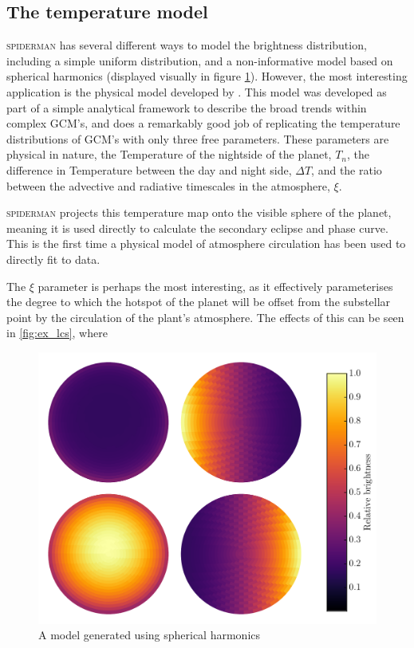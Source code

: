 \documentclass[a4paper,fleqn,usenatbib]{mnras}
\begin{document}
\subsection{The temperature model}\label{sec:temp model}

\textsc{spiderman} has several different ways to model the brightness distribution, including a simple uniform distribution, and a non-informative model based on spherical harmonics (displayed visually in figure \ref{fig:harmonics}). However, the most interesting application is the physical model developed by \citet{Zhang2016}. This model was developed as part of a simple analytical framework to describe the broad trends within complex GCM's, and does a remarkably good job of replicating the temperature distributions of GCM's with only three free parameters. These parameters are physical in nature, the Temperature of the nightside of the planet, $T_n$, the difference in Temperature between the day and night side, $\Delta T$, and the ratio between the advective and radiative timescales in the atmosphere, $\xi$.

\textsc{spiderman} projects this temperature map onto the visible sphere of the planet, meaning it is used directly to calculate the secondary eclipse and phase curve. This is the first time a physical model of atmosphere circulation has been used to directly fit to data.

The $\xi$ parameter is perhaps the most interesting, as it effectively parameterises the degree to which the hotspot of the planet will be offset from the substellar point by the circulation of the plant's atmosphere. The effects of this can be seen in \ref{fig:ex_lcs}, where

\begin{figure}
\begin{center}
\includegraphics[width=\columnwidth]{img/sphere_quad.pdf}
\caption{A model generated using spherical harmonics}
\label{fig:harmonics}
\end{center}
\end{figure}
\end{document}

